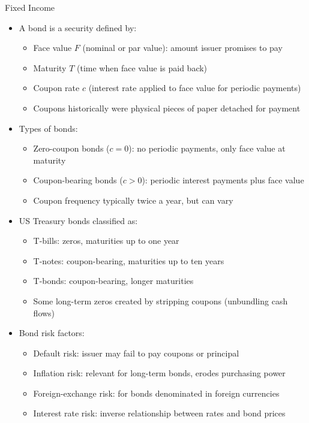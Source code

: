 \documentclass[10pt]{beamer}
\begin{document}
\begin{frame}{Fixed Income}
  \begin{itemize}[<+->]
    \item A bond is a security defined by:
      \begin{itemize}
        \item Face value $F$ (nominal or par value): amount issuer promises to pay
        \item Maturity $T$ (time when face value is paid back)
        \item Coupon rate $c$ (interest rate applied to face value for periodic payments)
        \item Coupons historically were physical pieces of paper detached for payment
      \end{itemize}
    \item Types of bonds:
      \begin{itemize}
        \item Zero-coupon bonds ($c = 0$): no periodic payments, only face value at maturity
        \item Coupon-bearing bonds ($c > 0$): periodic interest payments plus face value
        \item Coupon frequency typically twice a year, but can vary
      \end{itemize}
    \item US Treasury bonds classified as:
      \begin{itemize}
        \item T-bills: zeros, maturities up to one year
        \item T-notes: coupon-bearing, maturities up to ten years
        \item T-bonds: coupon-bearing, longer maturities
        \item Some long-term zeros created by stripping coupons (unbundling cash flows)
      \end{itemize}
    \item Bond risk factors:
      \begin{itemize}
        \item Default risk: issuer may fail to pay coupons or principal
        \item Inflation risk: relevant for long-term bonds, erodes purchasing power
        \item Foreign-exchange risk: for bonds denominated in foreign currencies
        \item Interest rate risk: inverse relationship between rates and bond prices
      \end{itemize}
  \end{itemize}
\end{frame}
\end{document}
